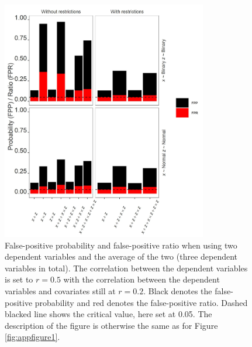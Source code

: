\begin{figure}[ht!]
\includegraphics[width=0.8\textwidth]{R/Analysis/Result/Figures/Figure3SI.jpeg}
\centering
\caption{False-positive probability and false-positive ratio when using two dependent variables and the average of the two (three dependent variables in total). The correlation between the dependent variables is set to  $\textit{r}=0.5$ with the correlation between the dependent variables and covariates still at  $\textit{r}=0.2$. Black denotes the false-positive probability and red denotes the false-positive ratio. Dashed blacked line shows the critical value, here set at 0.05. The description of the figure is otherwise the same as for Figure \ref{fig:appfigure1}.}
\label{fig:appfigure3}
\end{figure}


